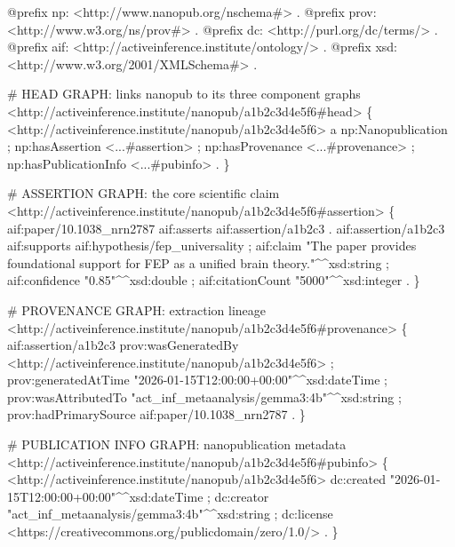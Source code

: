 \documentclass[
  english,
]{article}
\newenvironment{Shaded}{}{}
\newcommand{\NormalTok}[1]{#1}
\begin{document}
\begin{Shaded}
\begin{Highlighting}[]
\NormalTok{@prefix np:   \textless{}http://www.nanopub.org/nschema\#\textgreater{} .}
\NormalTok{@prefix prov: \textless{}http://www.w3.org/ns/prov\#\textgreater{} .}
\NormalTok{@prefix dc:   \textless{}http://purl.org/dc/terms/\textgreater{} .}
\NormalTok{@prefix aif:  \textless{}http://activeinference.institute/ontology/\textgreater{} .}
\NormalTok{@prefix xsd:  \textless{}http://www.w3.org/2001/XMLSchema\#\textgreater{} .}

\NormalTok{\# HEAD GRAPH: links nanopub to its three component graphs}
\NormalTok{\textless{}http://activeinference.institute/nanopub/a1b2c3d4e5f6\#head\textgreater{} \{}
\NormalTok{  \textless{}http://activeinference.institute/nanopub/a1b2c3d4e5f6\textgreater{}}
\NormalTok{    a np:Nanopublication ;}
\NormalTok{    np:hasAssertion       \textless{}...\#assertion\textgreater{} ;}
\NormalTok{    np:hasProvenance      \textless{}...\#provenance\textgreater{} ;}
\NormalTok{    np:hasPublicationInfo \textless{}...\#pubinfo\textgreater{} .}
\NormalTok{\}}

\NormalTok{\# ASSERTION GRAPH: the core scientific claim}
\NormalTok{\textless{}http://activeinference.institute/nanopub/a1b2c3d4e5f6\#assertion\textgreater{} \{}
\NormalTok{  aif:paper/10.1038\_nrn2787 aif:asserts aif:assertion/a1b2c3 .}
\NormalTok{  aif:assertion/a1b2c3}
\NormalTok{    aif:supports       aif:hypothesis/fep\_universality ;}
\NormalTok{    aif:claim          "The paper provides foundational support for FEP as a}
\NormalTok{                        unified brain theory."\^{}\^{}xsd:string ;}
\NormalTok{    aif:confidence     "0.85"\^{}\^{}xsd:double ;}
\NormalTok{    aif:citationCount  "5000"\^{}\^{}xsd:integer .}
\NormalTok{\}}

\NormalTok{\# PROVENANCE GRAPH: extraction lineage}
\NormalTok{\textless{}http://activeinference.institute/nanopub/a1b2c3d4e5f6\#provenance\textgreater{} \{}
\NormalTok{  aif:assertion/a1b2c3}
\NormalTok{    prov:wasGeneratedBy   \textless{}http://activeinference.institute/nanopub/a1b2c3d4e5f6\textgreater{} ;}
\NormalTok{    prov:generatedAtTime  "2026{-}01{-}15T12:00:00+00:00"\^{}\^{}xsd:dateTime ;}
\NormalTok{    prov:wasAttributedTo  "act\_inf\_metaanalysis/gemma3:4b"\^{}\^{}xsd:string ;}
\NormalTok{    prov:hadPrimarySource aif:paper/10.1038\_nrn2787 .}
\NormalTok{\}}

\NormalTok{\# PUBLICATION INFO GRAPH: nanopublication metadata}
\NormalTok{\textless{}http://activeinference.institute/nanopub/a1b2c3d4e5f6\#pubinfo\textgreater{} \{}
\NormalTok{  \textless{}http://activeinference.institute/nanopub/a1b2c3d4e5f6\textgreater{}}
\NormalTok{    dc:created "2026{-}01{-}15T12:00:00+00:00"\^{}\^{}xsd:dateTime ;}
\NormalTok{    dc:creator "act\_inf\_metaanalysis/gemma3:4b"\^{}\^{}xsd:string ;}
\NormalTok{    dc:license \textless{}https://creativecommons.org/publicdomain/zero/1.0/\textgreater{} .}
\NormalTok{\}}
\end{Highlighting}
\end{Shaded}
\end{document}
